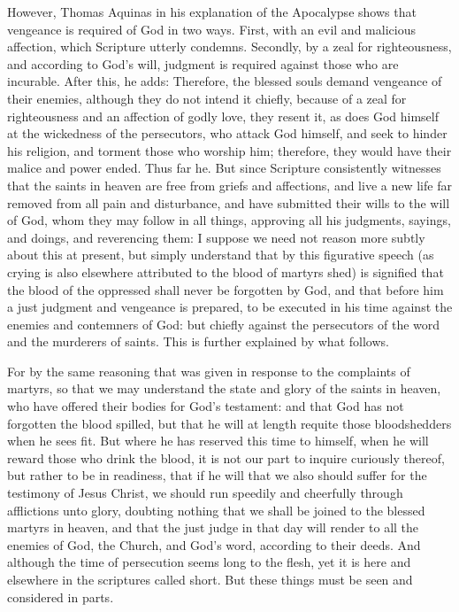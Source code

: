 However, Thomas Aquinas in his explanation of the Apocalypse shows that vengeance is required of God in two ways. First, with an evil and malicious affection, which Scripture utterly condemns. Secondly, by a zeal for righteousness, and according to God’s will, judgment is required against those who are incurable. After this, he adds: Therefore, the blessed souls demand vengeance of their enemies, although they do not intend it chiefly, because of a zeal for righteousness and an affection of godly love, they resent it, as does God himself at the wickedness of the persecutors, who attack God himself, and seek to hinder his religion, and torment those who worship him; therefore, they would have their malice and power ended. Thus far he. But since Scripture consistently witnesses that the saints in heaven are free from griefs and affections, and live a new life far removed from all pain and disturbance, and have submitted their wills to the will of God, whom they may follow in all things, approving all his judgments, sayings, and doings, and reverencing them: I suppose we need not reason more subtly about this at present, but simply understand that by this figurative speech (as crying is also elsewhere attributed to the blood of martyrs shed) is signified that the blood of the oppressed shall never be forgotten by God, and that before him a just judgment and vengeance is prepared, to be executed in his time against the enemies and contemners of God: but chiefly against the persecutors of the word and the murderers of saints. This is further explained by what follows.

For by the same reasoning that was given in response to the complaints of martyrs, so that we may understand the state and glory of the saints in heaven, who have offered their bodies for God’s testament: and that God has not forgotten the blood spilled, but that he will at length requite those bloodshedders when he sees fit. But where he has reserved this time to himself, when he will reward those who drink the blood, it is not our part to inquire curiously thereof, but rather to be in readiness, that if he will that we also should suffer for the testimony of Jesus Christ, we should run speedily and cheerfully through afflictions unto glory, doubting nothing that we shall be joined to the blessed martyrs in heaven, and that the just judge in that day will render to all the enemies of God, the Church, and God’s word, according to their deeds. And although the time of persecution seems long to the flesh, yet it is here and elsewhere in the scriptures called short. But these things must be seen and considered in parts.

